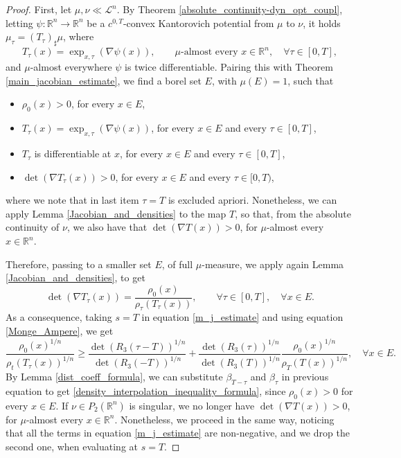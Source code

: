 \documentclass[reqno]{amsart}
\theoremstyle{plain}
\theoremstyle{definition}
\theoremstyle{remark}
\begin{document}
		\begin{proof}
			First, let $\mu,\nu\ll \mathscr{L}^n$. By Theorem \ref{absolute_continuity-dyn_opt_coupl}, letting $\psi:\mathbb{R}^n\to\mathbb{R}^n$ be a $c^{0,T}$-convex Kantorovich potential from $\mu$ to $\nu$, it holds $\mu_\tau = (T_\tau)_\sharp\mu$, where
\begin{equation}
			T_\tau(x)=\exp_{x,\tau}(\nabla\psi(x)),\qquad\mu\text{-almost every }x\in\mathbb{R}^n, \quad\forall \tau\in[0,T],
\end{equation}
and $\mu$-almost everywhere $\psi$ is twice differentiable. Pairing this with Theorem \ref{main_jacobian_estimate}, we find a borel set $E$, with $\mu(E)=1$, such that

			\begin{itemize}
				\item $\rho_0(x)>0$, for every $x\in E$,
				\item $T_\tau(x)=\exp_{x,\tau}(\nabla\psi(x))$, for every $x\in E$ and every $\tau\in[0,T]$,
				\item $T_\tau$ is differentiable at $x$, for every $x\in E$ and every $\tau\in[0,T]$,
				\item $\det(\nabla T_\tau(x))>0$, for every $x\in E$ and every $\tau\in[0,T)$,
			\end{itemize} 
			where we note that in last item $\tau=T$ is excluded apriori.
			Nonetheless, we can apply Lemma \ref{Jacobian_and_densities} to the map $T$, so that, from the absolute continuity of $\nu$, we also have that $\det(\nabla T(x))>0$, for $\mu$-almost every $x\in\mathbb{R}^n$.
            
			Therefore, passing to a smaller set $E$, of full $\mu$-measure, we apply again Lemma \ref{Jacobian_and_densities}, to get 
			\begin{equation}\label{Monge_Ampere}
				\det(\nabla T_\tau(x))=\frac{\rho_0(x)}{\rho_\tau(T_\tau(x))},\qquad\forall \tau\in[0,T],\quad\forall x\in E.
			\end{equation}
			As a consequence, taking $s=T$ in equation \eqref{m_j_estimate} and using equation \eqref{Monge_Ampere}, we get 
			\begin{equation}
				\frac{\rho_0(x)^{1/n}}{\rho_t(T_\tau(x))^{1/n}}\geq\frac{\det(R_3(\tau-T))^{1/n}}{\det(R_3(-T))^{1/n}}+\frac{\det(R_3(\tau))^{1/n}}{\det(R_3(T))^{1/n}}\frac{\rho_0(x)^{1/n}}{\rho_T(T(x))^{1/n}},\quad \forall x\in E.
			\end{equation}
			By Lemma \ref{dist_coeff_formula}, we can substitute $\beta_{T-\tau}$ and $\beta_{\tau}$ in previous equation to get \eqref{density_interpolation_inequality_formula}, since $\rho_0(x)>0$ for every $x\in E$. If $\nu\in P_2(\mathbb{R}^n)$ is singular, we no longer have $\det(\nabla T(x))>0$, for $\mu$-almost every $x\in\mathbb{R}^n$. Nonetheless, we proceed in the same way, noticing that all the terms in equation \eqref{m_j_estimate} are non-negative, and we drop the second one, when evaluating at $s=T$.
		\end{proof}
        
\end{document}
